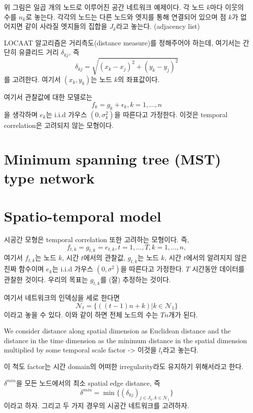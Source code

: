 \documentclass[b5paper,]{scrbook}
\theoremstyle{plain}
\theoremstyle{definition}
\numberwithin{equation}{section}
\begin{document}
위 그림은 일곱 개의 노드로 이루어진 공간 네트워크 예제이다. 각 노드
\(k\)마다 이웃의 수를 \(n_{k}\)로 놓는다. 각각의 노드는 다른 노드와
엣지를 통해 연결되어 있으며 점 \(k\)가 없어지면 같이 사라질 엣지들의
집합을 \(J_{k}\)라고 놓는다. (adjacency list)

LOCAAT 알고리즘은 거리측도(distance measure)를 정해주어야 하는데,
여기서는 간단히 유클리드 거리 \(\delta_{kj}\), 즉
\[\delta_{kj}=\sqrt{(x_{k}-x_{j})^{2}+(y_{k}-y_{j})^{2}}\] 를 고려한다.
여기서 \((x_{k},y_{k})\)는 노드 \(k\)의 좌표값이다.

여기서 관찰값에 대한 모델로는
\[f_{k}=g_{k}+\epsilon_{k}, k=1,\ldots , n\] 을 생각하며 \(e_{k}\)는
i.i.d 가우스 \((0,\sigma_{k}^{2})\)을 따른다고 가정한다. 이것은 temporal
correlation은 고려되지 않는 모형이다.

\section{Minimum spanning tree (MST) type
network}\label{minimum-spanning-tree-mst-type-network}

\section{Spatio-temporal model}\label{spatio-temporal-model}

시공간 모형은 temporal correlation 또한 고려하는 모형이다. 즉,
\[f_{t,k}=g_{t,k}=e_{t,k}, t=1,\ldots, T, k=1,\ldots , n,\] 여기서
\(f_{t,k}\)는 노드 \(k\), 시간 \(t\)에서의 관찰값, \(g_{t,k}\)는 노드
\(k\), 시간 \(t\)에서의 알려지지 않은 진짜 함수이며 \(e_{k}\)는 i.i.d
가우스 \((0,\sigma^{2})\)을 따른다고 가정한다. \(T\) 시간동안 데이터를
관찰한 것이다. 우리의 목표는 \(g_{t,k}\)를 (잘) 추정하는 것이다.

여기서 네트워크의 인덱싱을 세로 한다면
\[\mathcal{N}_{t}=\{((t-1)n+k)| k \in \mathcal{N}_{1}\}\] 이라고 놓을 수
있다. 이와 같이 하면 전체 노드의 수는 \(Tn\)개가 된다.

We consider distance along spatial dimension as Euclidean distance and
the distance in the time dimension as the minimum distance in the
spatial dimension multiplied by some temporal scale factor
-\textgreater{} 이것을 \(l_{t}\)라고 놓는다.

이 척도 factor는 시간 domain의 어떠한 irregularity라도 유지하기
위해서라고 한다.

\(\delta^{min}\)을 모든 노드에서의 최소 spatial edge distance, 즉
\[\delta^{min}=\min \{ (\delta_{kj})_{j\in J_{k}, k\in \mathcal{N}_{1}}\}\]
이라고 하자. 그리고 두 가지 경우의 시공간 네트워크를 고려하자.
\end{document}
